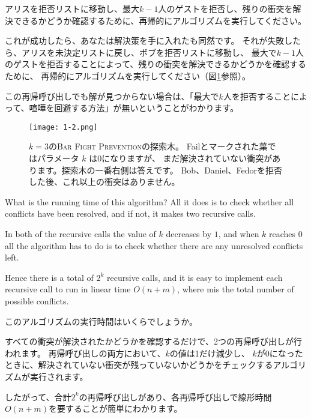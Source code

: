 \documentclass{jsarticle}
\begin{document}
アリスを拒否リストに移動し、最大$k-1$人のゲストを拒否し、残りの衝突を解決できるかどうか確認するために、再帰的にアルゴリズムを実行してください。

これが成功したら、あなたは解決策を手に入れたも同然です。
それが失敗したら、アリスを未決定リストに戻し、ボブを拒否リストに移動し、
最大で$k-1$人のゲストを拒否することによって、残りの衝突を解決できるかどうかを確認するために、
再帰的にアルゴリズムを実行してください（図\ref{fig:1.2}参照）。

この再帰呼び出しでも解が見つからない場合は、「最大で$k$人を拒否することによって、喧嘩を回避する方法」が無いということがわかります。


\begin{figure}[htbp]
    \centering

      \texttt{[image: 1-2.png]}
      
      \centering
      \caption{
             $k=3$の\textsc{Bar Fight Prevention}の探索木。
Failとマークされた葉ではパラメータ $k$ は0になりますが、
まだ解決されていない衝突があります。探索木の一番右側は答えです。
Bob、Daniel、Fedorを拒否した後、これ以上の衝突はありません。
        }
      \label{fig:1.2}
  \end{figure}

\newpage

\begin{screen}

    What is the running time of this algorithm? 
    All it does is to check whether all conflicts have been resolved, 
    and if not, it makes two recursive calls. 
    
    In both of the recursive calls the value of $k$ decreases by $1$, 
    and when $k$ reaches 0 all the algorithm has to do is 
    to check whether there are any unresolved conflicts left. 
    
    Hence there is a total of $2^k$ recursive calls, and it is easy to implement each recursive call to run in linear time $O(n+m)$, where mis the total number of possible conflicts. 
\end{screen}

このアルゴリズムの実行時間はいくらでしょうか。

すべての衝突が解決されたかどうかを確認するだけで、2つの再帰呼び出しが行われます。
再帰呼び出しの両方において、$k$の値は1だけ減少し、
$k$が0になったときに、解決されていない衝突が残っていないかどうかをチェックするアルゴリズムが実行されます。

したがって、合計$2^k$の再帰呼び出しがあり、各再帰呼び出しで線形時間$O(n + m)$を要することが簡単にわかります。
\end{document}
